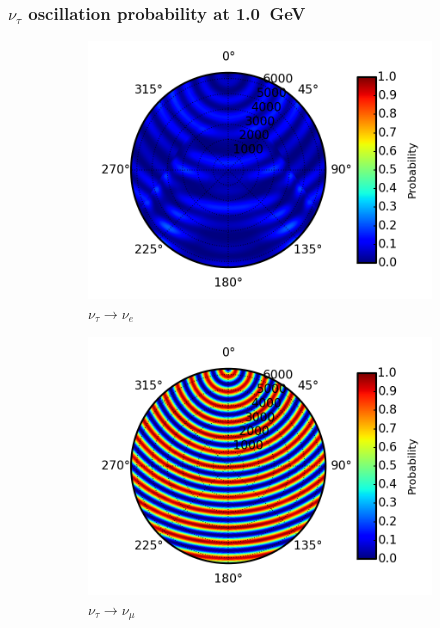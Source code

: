 \documentclass{beamer}
\begin{document}
\begin{frame}
	\frametitle{$\nu_{\tau}$ oscillation probability at \SI{1.0}{GeV}}
	\begin{figure}
		\centering
		\begin{subfigure}[b]{0.33\linewidth}
			\caption{ $\nu_{\tau} \rightarrow \nu_{e}$ }
			\includegraphics[width=\linewidth]{earth_1.0gev_nutau2nue_throughEarth.png}
		\end{subfigure}
		\begin{subfigure}[b]{0.33\linewidth}
			\caption{ $\nu_{\tau} \rightarrow \nu_{\mu}$ }
			\includegraphics[width=\linewidth]{earth_1.0gev_nutau2numu_throughEarth.png}
		\end{subfigure}
		\begin{subfigure}[b]{0.33\linewidth}

\end{subfigure}
\end{figure}
\end{frame}
\end{document}
